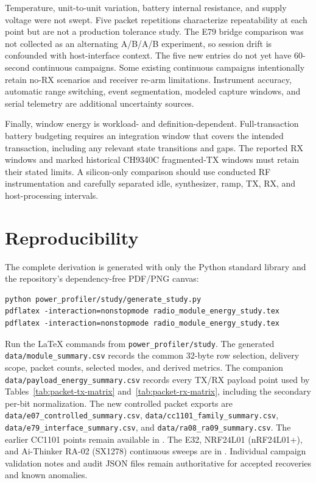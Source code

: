\documentclass[10pt,a4paper]{article}
\newcommand{\code}[1]{\texttt{#1}}
\begin{document}
Temperature, unit-to-unit variation, battery internal resistance, and supply voltage were not swept. Five packet repetitions characterize repeatability at each point but are not a production tolerance study. The E79 bridge comparison was not collected as an alternating A/B/A/B experiment, so session drift is confounded with host-interface context. The five new entries do not yet have 60-second continuous campaigns. Some existing continuous campaigns intentionally retain no-RX scenarios and receiver re-arm limitations. Instrument accuracy, automatic range switching, event segmentation, modeled capture windows, and serial telemetry are additional uncertainty sources.

Finally, window energy is workload- and definition-dependent. Full-transaction battery budgeting requires an integration window that covers the intended transaction, including any relevant state transitions and gaps. The reported RX windows and marked historical CH9340C fragmented-TX windows must retain their stated limits. A silicon-only comparison should use conducted RF instrumentation and carefully separated idle, synthesizer, ramp, TX, RX, and host-processing intervals.

\section{Reproducibility}

The complete derivation is generated with only the Python standard library and the repository's dependency-free PDF/PNG canvas:
\begin{verbatim}
python power_profiler/study/generate_study.py
pdflatex -interaction=nonstopmode radio_module_energy_study.tex
pdflatex -interaction=nonstopmode radio_module_energy_study.tex
\end{verbatim}
Run the LaTeX commands from \code{power\_profiler/study}. The generated \code{data/module\_summary.csv} records the common 32-byte row selection, delivery scope, packet counts, selected modes, and derived metrics. The companion \code{data/payload\_energy\_summary.csv} records every TX/RX payload point used by Tables~\ref{tab:packet-tx-matrix} and~\ref{tab:packet-rx-matrix}, including the secondary per-bit normalization. The new controlled packet exports are \code{data/e07\_controlled\_summary.csv}, \code{data/cc1101\_family\_summary.csv}, \code{data/e79\_interface\_summary.csv}, and \code{data/ra08\_ra09\_summary.csv}. The earlier CC1101 points remain available in . The E32, NRF24L01 (nRF24L01+), and Ai-Thinker RA-02 (SX1278) continuous sweeps are in . Individual campaign validation notes and audit JSON files remain authoritative for accepted recoveries and known anomalies.
\end{document}

